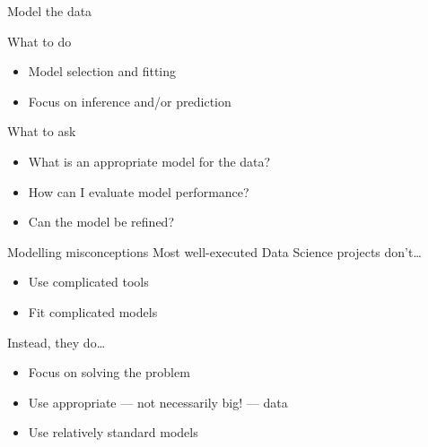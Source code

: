 \begin{frame}[t]{Model the data}
    \begin{block}{What to do}
        \begin{itemize}
            \item Model selection and fitting
            \item Focus on inference and/or prediction
        \end{itemize}
    \end{block}
    \vfill
    \begin{block}{What to ask}
        \begin{itemize}
            \item What is an appropriate model for the data?
            \item How can I evaluate model performance?
            \item Can the model be refined?
        \end{itemize}
    \end{block}
\end{frame}

\begin{frame}{Modelling misconceptions}
    Most well\hyp{}executed Data Science projects don't\ldots
    \begin{itemize}
        \item Use complicated tools
        \item Fit complicated models
    \end{itemize}
    \vfill
    Instead, they do\ldots
    \begin{itemize}
        \item Focus on solving the problem
        \item Use appropriate --- not necessarily big! --- data
        \item Use relatively standard models
    \end{itemize}
\end{frame}

